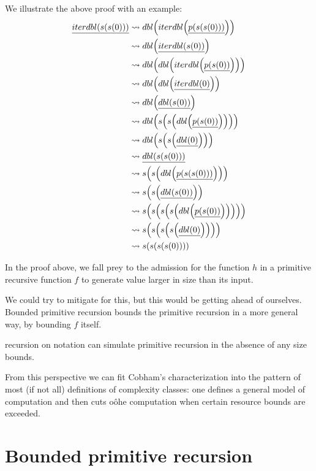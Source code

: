 \begin{example}
We illustrate the above proof with an example:
\begin{align}
\underline{iterdbl\p{s\p{s\p{0}}}}
  &\leadsto dbl\p{iterdbl\p{\underline{p\p{s\p{s\p{0}}}}}} \\
  &\leadsto dbl\p{\underline{iterdbl\p{s\p{0}}}} \\
  &\leadsto dbl\p{dbl\p{iterdbl\p{\underline{p\p{s\p{0}}}}}} \\
  &\leadsto dbl\p{dbl\p{\underline{iterdbl\p{0}}}} \\
  &\leadsto dbl\p{\underline{dbl\p{s\p{0}}}} \\
  &\leadsto dbl\p{s\p{s\p{dbl\p{\underline{p\p{s\p{0}}}}}}} \\
  &\leadsto dbl\p{s\p{s\p{\underline{dbl\p{0}}}}} \\
  &\leadsto \underline{dbl\p{s\p{s\p{0}}}} \\
  &\leadsto s\p{s\p{dbl\p{\underline{p\p{s\p{s\p{0}}}}}}} \\
  &\leadsto s\p{s\p{\underline{dbl\p{s\p{0}}}}} \\
  &\leadsto s\p{s\p{s\p{s\p{dbl\p{\underline{p\p{s\p{0}}}}}}}} \\
  &\leadsto s\p{s\p{s\p{s\p{\underline{dbl\p{0}}}}}} \\
  &\leadsto s\p{s\p{s\p{s\p{0}}}} \\
\end{align}
\end{example}

In the proof above, we fall prey to the admission for the function $h$ in a
primitive recursive function $f$ to generate value larger in size than its
input.

We could try to mitigate for this, but this would be getting ahead of
ourselves. Bounded primitive recursion bounds the primitive recursion in a more
general way, by bounding $f$ itself.

recursion on notation can simulate primitive recursion in the absence of any
size bounds\cite{bellantoni-phd-1992}.

From this perspective we can fit Cobham's characterization into the pattern of
most (if not all) definitions of complexity classes: one defines a general
model of computation and then cuts oôhe computation when certain resource
bounds are exceeded.


\section{Bounded primitive recursion}

